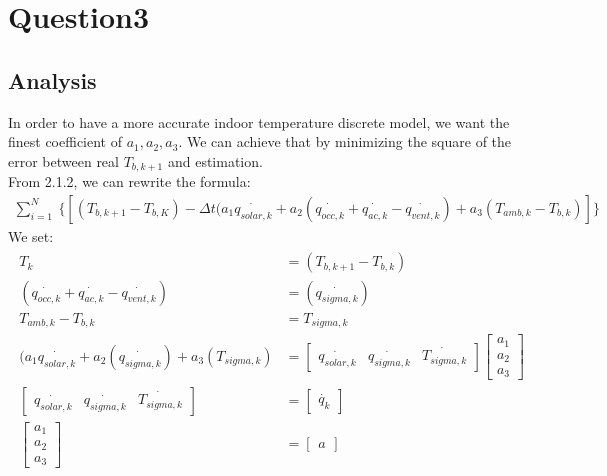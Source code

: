 \documentclass[titlepage,a4paper]{article}
\begin{document}
\section{Question3}

\fi
    \subsection{Analysis}
        In order to have a more accurate indoor temperature discrete model, we want the finest coefficient of $a_1,a_2,a_3$. We can achieve that by minimizing the square of the error between real $T_{b,k+1}$ and estimation.\\
        From 2.1.2, we can rewrite the formula:
        \begin{align}\label{1.10}
            \sum_{i=1}^N \:\{[(T_{b,k+1} - T_{b,K}) - \Delta t (a_1\dot{q_{solar,k}} + a_2(\dot{q_{occ,k}}+\dot{q_{ac,k}}-\dot{q_{vent,k}}) + a_3(T_{amb,k} - T_{b,k}) ]  \}
        \end{align}
        We set:
        \begin{align}
        \begin{split}
            T_k &= (T_{b,k+1} - T_{b,k})\\
            (\dot{q_{occ,k}}+\dot{q_{ac,k}}-\dot{q_{vent,k}}) &= (\dot{q_{sigma,k}})\\
            T_{amb,k} - T_{b,k} &= T_{sigma,k}\\
            (a_1\dot{q_{solar,k}} + a_2(\dot{q_{sigma,k}}) + a_3(T_{sigma,k}) &= 
            \begin{bmatrix} \dot{q_{solar,k}}&\dot{q_{sigma,k}}&\dot{T_{sigma,k}} \end{bmatrix} 
            \begin{bmatrix} a_1\\a_2\\a_3 \end{bmatrix}\\
            \begin{bmatrix} \dot{q_{solar,k}}&\dot{q_{sigma,k}}&\dot{T_{sigma,k}} \end{bmatrix} &= 
            \begin{bmatrix} \dot{q_k} \end{bmatrix}\\
            \begin{bmatrix} a_1\\a_2\\a_3 \end{bmatrix} &= 
            \begin{bmatrix} a \end{bmatrix}
        \end{split}
        \end{align}
\end{document}
